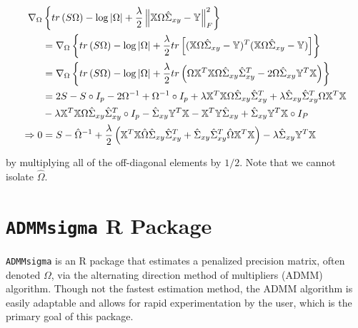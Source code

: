\documentclass[11pt,]{report}
\begin{document}
\begin{equation}
\begin{split}
  \nabla_{\Omega}&\left\{ tr\left(S\Omega\right) - \log\left|\Omega\right| + \frac{\lambda}{2}\left\|\mathbb{X}\Omega\hat{\Sigma}_{xy} - \mathbb{Y}\right\|_{F}^{2} \right\} \\
  &= \nabla_{\Omega}\left\{ tr\left(S\Omega\right) - \log\left|\Omega\right| + \frac{\lambda}{2}tr\left[(\mathbb{X}\Omega\hat{\Sigma}_{xy} - \mathbb{Y})^{T}(\mathbb{X}\Omega\hat{\Sigma}_{xy} - \mathbb{Y}) \right] \right\} \\
  &= \nabla_{\Omega}\left\{ tr\left(S\Omega\right) - \log\left|\Omega\right| + \frac{\lambda}{2}tr\left(\Omega\mathbb{X}^{T}\mathbb{X}\Omega\hat{\Sigma}_{xy}\hat{\Sigma}_{xy}^{T} - 2\Omega\hat{\Sigma}_{xy}\mathbb{Y}^{T}\mathbb{X} \right) \right\} \\
  &= 2S - S\circ I_{p} - 2\Omega^{-1} + \Omega^{-1}\circ I_{p} + \lambda\mathbb{X}^{T}\mathbb{X}\Omega\hat{\Sigma}_{xy}\hat{\Sigma}_{xy}^{T} + \lambda\hat{\Sigma}_{xy}\hat{\Sigma}_{xy}^{T}\Omega\mathbb{X}^{T}\mathbb{X} \\
  &- \lambda\mathbb{X}^{T}\mathbb{X}\Omega\hat{\Sigma}_{xy}\hat{\Sigma}_{xy}^{T}\circ I_{p} - \hat{\Sigma}_{xy}\mathbb{Y}^{T}\mathbb{X} - \mathbb{X}^{T}\mathbb{Y}\hat{\Sigma}_{xy} + \hat{\Sigma}_{xy}\mathbb{Y}^{T}\mathbb{X}\circ I_{P} \\
  \Rightarrow 0 &= S - \hat{\Omega}^{-1} + \frac{\lambda}{2}\left(\mathbb{X}^{T}\mathbb{X}\hat{\Omega}\hat{\Sigma}_{xy}\hat{\Sigma}_{xy}^{T} + \hat{\Sigma}_{xy}\hat{\Sigma}_{xy}^{T}\hat{\Omega}\mathbb{X}^{T}\mathbb{X} \right) - \lambda\hat{\Sigma}_{xy}\mathbb{Y}^{T}\mathbb{X}
\label{eq:penregressionproof}\notag
\end{split}
\end{equation}

by multiplying all of the off-diagonal elements by \(1/2\). Note that we cannot isolate \(\hat{\Omega}\).

\hypertarget{admmsigma-r-package}{%
\chapter{\texorpdfstring{\texttt{ADMMsigma} R Package}{ADMMsigma R Package}}\label{admmsigma-r-package}}

\texttt{ADMMsigma} is an R package that estimates a penalized precision matrix, often denoted \(\Omega\), via the alternating direction method of multipliers (ADMM) algorithm. Though not the fastest estimation method, the ADMM algorithm is easily adaptable and allows for rapid experimentation by the user, which is the primary goal of this package.
\end{document}
